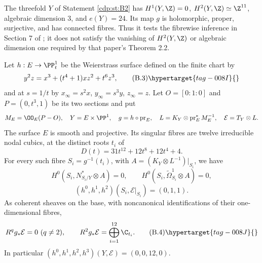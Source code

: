 
\begin{proposition}\hypertarget{tag-01BM}{}\label{cdp:st:B3}


The threefold $Y$ of Statement \ref{cdp:st:B2} has $H^1(Y,\Z)=0$, $H^2(Y,\Z)\simeq\Z^{11}$, algebraic dimension $3$, and $e(Y)=24$. Its map $g$ is holomorphic, proper, surjective, and has connected fibres. Thus it tests the fibrewise inference in Section 7 of \cite{CDP20}; it does not satisfy the vanishing of $H^2(Y,\Z)$ or algebraic dimension one required by that paper's Theorem 2.2.
\end{proposition}

\begin{proposition}\hypertarget{tag-01BL}{}\label{cdp:st:B2}


Let $h:E\to\PP^1_t$ be the Weierstrass surface defined on the finite chart by
\[
 y^2z=x^3+(t^4+1)xz^2+t^6z^3,                          \tag{B.3}\hypertarget{tag-008I}{}\label{cdp:eq:B.3}
\]
and at $s=1/t$ by $x_\infty=s^2x$, $y_\infty=s^3y$, $z_\infty=z$. Let $O=[0:1:0]$ and $P=(0,t^3,1)$ be its two sections and put
\[
 M_E=\OO_E(P-O),\quad Y=E\times\PP^1,\quad
 g=h\circ\operatorname{pr}_E,\quad
 L=K_Y\otimes\operatorname{pr}_E^*M_E^{-1},\quad
 \mathcal E=T_Y\otimes L.
\]
The surface $E$ is smooth and projective. Its singular fibres are twelve irreducible nodal cubics, at the distinct roots $t_i$ of
\[
 D(t)=31t^{12}+12t^8+12t^4+4.
\]
For every such fibre $S_i=g^{-1}(t_i)$, with $A=(K_Y\otimes L^{-1})|_{S_i}$, we have
\[
H^0(S_i,N^*_{S_i/Y}\otimes A)=0,
\qquad H^0(S_i,\widetilde\Omega^1_{S_i}\otimes A)=0,
\]
\[
 (h^0,h^1,h^2)(S_i,\mathcal E|_{S_i})=(0,1,1).
\]
As coherent sheaves on the base, with noncanonical identifications of their one-dimensional fibres,
\[
 R^qg_*\mathcal E=0\ (q\ne2),\qquad
 R^2g_*\mathcal E=\bigoplus_{i=1}^{12}\C_{t_i}.        \tag{B.4}\hypertarget{tag-008J}{}\label{cdp:eq:B.4}
\]
In particular $(h^0,h^1,h^2,h^3)(Y,\mathcal E)=(0,0,12,0)$.
\end{proposition}

